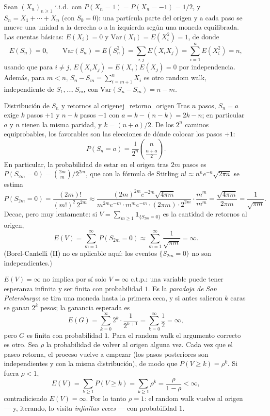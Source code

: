 \documentclass[11pt, a4paper]{article}
\begin{document}
Sean $(X_n)_{n \ge 1}$ i.i.d.\ con $P(X_n = 1) = P(X_n = -1) = 1/2$, y $S_n = X_1 + \cdots +
X_n$ (con $S_0 = 0$): una partícula parte del origen y a cada paso se mueve una unidad a la
derecha o a la izquierda según una moneda equilibrada. Las cuentas básicas: $E(X_i) = 0$ y
$\mathrm{Var}(X_i) = E(X_i^2) = 1$, de donde
$$ E(S_n) = 0, \qquad \mathrm{Var}(S_n) = E(S_n^2) = \sum_{i,j} E(X_i X_j) = \sum_{i=1}^n
E(X_i^2) = n, $$
usando que para $i \ne j$, $E(X_i X_j) = E(X_i) E(X_j) = 0$ por independencia. Además, para
$m < n$, $S_n - S_m = \sum_{i = m+1}^n X_i$ es otro random walk, independiente de
$S_1, \dots, S_m$, con $\mathrm{Var}(S_n - S_m) = n - m$.

\begin{ejemplo}{Distribución de $S_n$ y retornos al origen}{ej_retorno_origen}
Tras $n$ pasos, $S_n = a$ exige $k$ pasos $+1$ y $n - k$ pasos $-1$ con $a = k - (n - k) =
2k - n$; en particular $a$ y $n$ tienen la misma paridad, y $k = (n + a)/2$. De los $2^n$
caminos equiprobables, los favorables son las elecciones de dónde colocar los pasos $+1$:
$$ P(S_n = a) = \frac{1}{2^n} \binom{n}{\frac{n+a}{2}}. $$
En particular, la probabilidad de estar en el origen tras $2m$ pasos es $P(S_{2m} = 0) =
\binom{2m}{m} / 2^{2m}$, que con la fórmula de Stirling $n! \approx n^n e^{-n} \sqrt{2 \pi n}$
se estima
$$ P(S_{2m} = 0) = \frac{(2m)!}{(m!)^2 \, 2^{2m}} \approx
\frac{(2m)^{2m} e^{-2m} \sqrt{4 \pi m}}{m^{2m} e^{-m} \cdot m^{m} e^{-m} \cdot (2 \pi m) \cdot
2^{2m}} \cdot \frac{m^{m}}{m^{m}} = \frac{\sqrt{4 \pi m}}{2 \pi m} = \frac{1}{\sqrt{\pi m}}. $$
Decae, pero muy lentamente: si $V = \sum_{m \ge 1} \mathbf{1}_{\{S_{2m} = 0\}}$ es la cantidad
de retornos al origen,
$$ E(V) = \sum_{m=1}^\infty P(S_{2m} = 0) \approx \sum_{m=1}^\infty \frac{1}{\sqrt{\pi m}} =
\infty. $$
(Borel-Cantelli (II) no es aplicable aquí: los eventos $\{S_{2m} = 0\}$ no son
independientes.)
\end{ejemplo}

\obs $E(V) = \infty$ no implica por sí solo $V = \infty$ c.t.p.: una variable puede tener
esperanza infinita y ser finita con probabilidad $1$. Es la \emph{paradoja de San
Petersburgo}: se tira una moneda hasta la primera ceca, y si antes salieron $k$ caras se ganan
$2^k$ pesos; la ganancia esperada es
$$ E(G) = \sum_{k=0}^\infty 2^k \cdot \frac{1}{2^{k+1}} = \sum_{k=0}^\infty \frac{1}{2} =
\infty, $$
pero $G$ es finita con probabilidad $1$. Para el random walk el argumento correcto es otro. Sea
$\rho$ la probabilidad de volver al origen alguna vez. Cada vez que el paseo retorna, el
proceso vuelve a empezar (los pasos posteriores son independientes y con la misma
distribución), de modo que $P(V \ge k) = \rho^k$. Si fuera $\rho < 1$,
$$ E(V) = \sum_{k \ge 1} P(V \ge k) = \sum_{k \ge 1} \rho^k = \frac{\rho}{1 - \rho} < \infty, $$
contradiciendo $E(V) = \infty$. Por lo tanto $\rho = 1$: el random walk vuelve al origen — y,
iterando, lo visita \emph{infinitas veces} — con probabilidad $1$.
\end{document}
